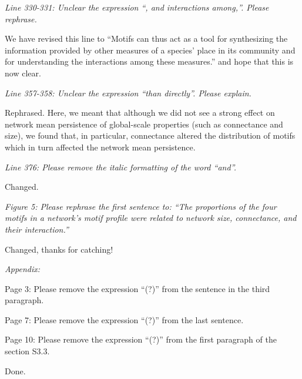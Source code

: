 \documentclass[12pt]{article}
\newcommand{\us}{\rm \setlength{\leftskip}{0.3cm} \setlength{\rightskip}{0.3cm}}
\newcommand{\them}{\it \setlength{\leftskip}{0cm} \setlength{\rightskip}{0cm}}
\begin{document}

\them
Line 330-331: Unclear the expression “, and interactions among,”. Please rephrase.

\us We have revised this line to ``Motifs can thus act as a tool for synthesizing the information provided by other measures of a species' place in its community and for understanding the interactions among these measures.'' and hope that this is now clear.

\them
Line 357-358: Unclear the expression “than directly”. Please explain.

\us
Rephrased. Here, we meant that although we did not see a strong effect on network mean persistence of global-scale properties (such as connectance and size), we found that, in particular, connectance altered the distribution of motifs which in turn affected the network mean persistence.  

\them
Line 376: Please remove the italic formatting of the word “and”.

\us
Changed.

\them
Figure 5: Please rephrase the first sentence to: “The proportions of the four motifs in a network's motif profile were related to network size, connectance, and their interaction.”

\us
Changed, thanks for catching!

\them
Appendix:

Page 3: Please remove the expression “(?)” from the sentence in the third paragraph.

Page 7: Please remove the expression “(?)” from the last sentence.

Page 10: Please remove the expression “(?)” from the first paragraph of the section S3.3.

\us
Done.
\end{document}
